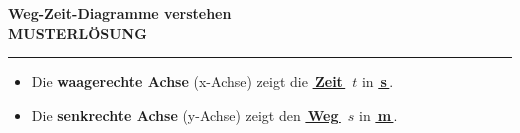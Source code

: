\documentclass[11pt,a4paper]{article}
\newcommand{\lsg}[1]{\textcolor{loesung}{\textbf{#1}}}
\newcommand{\lueckelsg}[1]{\underline{\lsg{\,#1\,}}}
\begin{document}
\begin{center}
    {\Large\bfseries\textcolor{physik}{Weg-Zeit-Diagramme verstehen}}\\[0.2em]
    {\small\textcolor{loesung}{\textbf{MUSTERLÖSUNG}}}
\end{center}
\vspace{0.2em}
\hrule
\vspace{0.8em}

\begin{merkkasten}[title=Kasten 1: Aufbau eines Weg-Zeit-Diagramms]
\begin{minipage}[t]{0.55\textwidth}
\vspace{0pt}
\begin{itemize}[leftmargin=*, itemsep=3pt, topsep=0pt]
    \item Die \textbf{waagerechte Achse} (x-Achse) zeigt die \lueckelsg{Zeit}~$t$ in \lueckelsg{s}.
    \item Die \textbf{senkrechte Achse} (y-Achse) zeigt den \lueckelsg{Weg}~$s$ in \lueckelsg{m}.
\end{itemize}
\end{minipage}
\hfill
\begin{minipage}[t]{0.40\textwidth}
\vspace{0pt}
\end{minipage}
\end{merkkasten}

\vspace{0.6em}
\end{document}
